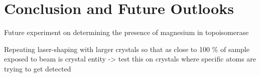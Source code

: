 \section{Conclusion and Future Outlooks}

Future experiment on determining the presence of magnesium in topoisomerase

Repeating laser-shaping with larger crystals so that as close to 100 \% of sample exposed to beam is crystal entity -> test this on crystals where specific atoms are trying to get detected